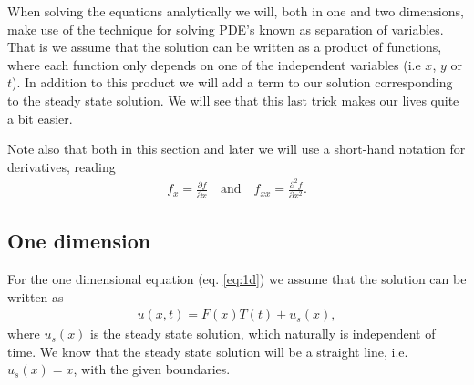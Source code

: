 \documentclass[12pt, a4paper]{article}
\begin{document}
When solving the equations analytically we will, both in one and two dimensions, make use of the 
technique for solving PDE's known as separation of variables. That is we assume that the solution 
can be written as a product of functions, where each function only depends on one of the independent 
variables (i.e $x$, $y$ or $t$). In addition to this product we will add a term to our solution 
corresponding to the steady state solution. We will see that this last trick makes our lives quite a 
bit easier.  

Note also that both in this section and later we will use a short-hand notation for derivatives, 
reading 
\begin{align*}
f_x = \frac{\partial f}{\partial x} \quad \text{and} \quad f_{xx} = \frac{\partial^2 f}{\partial x^2}. 
\end{align*}

\subsection{One dimension}

For the one dimensional equation (eq. \ref{eq:1d}) we assume that the solution can be written as 
\begin{align*}
u(x,t) = F(x)T(t) + u_s(x), 
\end{align*}
where $u_s(x)$ is the steady state solution, which naturally is independent of time. We know that the 
steady state solution will be a straight line, i.e. $u_s(x)=x$, with the given boundaries. 
\end{document}
